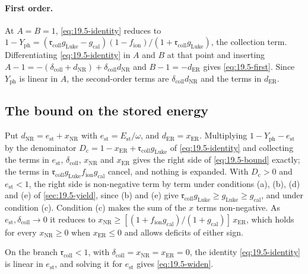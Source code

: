 \paragraph{First order.} At $A = B = 1$, \cref{eq:19.5-identity} reduces to $1 - Y_{\mathrm{ph}} = (\mathfrak{r}_{\mathrm{coll}}g_{\mathrm{Luke}} - g_{\mathrm{cal}})(1 - f_{\mathrm{ion}})/(1 + \mathfrak{r}_{\mathrm{coll}}g_{\mathrm{Luke}})$, the collection term. Differentiating \cref{eq:19.5-identity} in $A$ and $B$ at that point and inserting $A - 1 = -(\delta_{\mathrm{coll}} + d_{\mathrm{NR}}) + \delta_{\mathrm{coll}}d_{\mathrm{NR}}$ and $B - 1 = -d_{\mathrm{ER}}$ gives \cref{eq:19.5-first}. Since $Y_{\mathrm{ph}}$ is linear in $A$, the second-order terms are $\delta_{\mathrm{coll}}d_{\mathrm{NR}}$ and the terms in $d_{\mathrm{ER}}$.

\subsection{The bound on the stored energy}

Put $d_{\mathrm{NR}} = e_{\mathrm{st}} + x_{\mathrm{NR}}$ with $e_{\mathrm{st}} = E_{\mathrm{st}}/\omega$, and $d_{\mathrm{ER}} = x_{\mathrm{ER}}$. Multiplying $1 - Y_{\mathrm{ph}} - e_{\mathrm{st}}$ by the denominator $D_{\mathrm{c}} = 1 - x_{\mathrm{ER}} + \mathfrak{r}_{\mathrm{coll}}g_{\mathrm{Luke}}$ of \cref{eq:19.5-identity} and collecting the terms in $e_{\mathrm{st}}$, $\delta_{\mathrm{coll}}$, $x_{\mathrm{NR}}$ and $x_{\mathrm{ER}}$ gives the right side of \cref{eq:19.5-bound} exactly; the terms in $\mathfrak{r}_{\mathrm{coll}}g_{\mathrm{Luke}}f_{\mathrm{ion}}g_{\mathrm{cal}}$ cancel, and nothing is expanded. With $D_{\mathrm{c}} > 0$ and $e_{\mathrm{st}} < 1$, the right side is non-negative term by term under conditions (a), (b), (d) and (e) of \cref{sec:19.5-yield}, since (b) and (e) give $\mathfrak{r}_{\mathrm{coll}}g_{\mathrm{Luke}} \ge g_{\mathrm{Luke}} \ge g_{\mathrm{cal}}$, and under condition (c). Condition (c) makes the sum of the $x$ terms non-negative. As $e_{\mathrm{st}}, \delta_{\mathrm{coll}} \to 0$ it reduces to $x_{\mathrm{NR}} \ge [(1 + f_{\mathrm{ion}}g_{\mathrm{cal}})/(1 + g_{\mathrm{cal}})]\,x_{\mathrm{ER}}$, which holds for every $x_{\mathrm{NR}} \ge 0$ when $x_{\mathrm{ER}} \le 0$ and allows deficits of either sign.

On the branch $\mathfrak{r}_{\mathrm{coll}} < 1$, with $\delta_{\mathrm{coll}} = x_{\mathrm{NR}} = x_{\mathrm{ER}} = 0$, the identity \cref{eq:19.5-identity} is linear in $e_{\mathrm{st}}$, and solving it for $e_{\mathrm{st}}$ gives \cref{eq:19.5-widen}.

